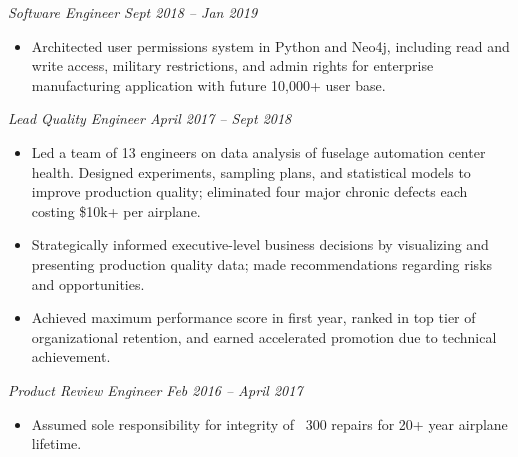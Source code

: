 \documentclass[10pt,letterpaper]{article}
\begin{document}
        \quad \emph{Software Engineer \hfill Sept 2018 – Jan 2019}

            \begin{itemize}[label={--}, leftmargin=.5in, labelindent=16pt, topsep=1pt]
                \setlength\itemsep{-.25em}
            	\item Architected user permissions system in Python and Neo4j, including read and write access, military restrictions, and admin rights for enterprise manufacturing application with future 10,000+ user base.
            \end{itemize}

        \quad \emph{Lead Quality Engineer \hfill April 2017 – Sept 2018}

            \begin{itemize}[label={--}, leftmargin=.5in, labelindent=16pt, topsep=1pt]
                \setlength\itemsep{-.25em}
            	\item Led a team of 13 engineers on data analysis of fuselage automation center health. Designed experiments, sampling plans, and statistical models to improve production quality; eliminated four major chronic defects each costing \$10k+ per airplane.
            	\item Strategically informed executive-level business decisions by visualizing and presenting production quality data; made recommendations regarding risks and opportunities.
            	\item Achieved maximum performance score in first year, ranked in top tier of organizational retention, and earned accelerated promotion due to technical achievement.
            \end{itemize}

        \quad \emph{Product Review Engineer \hfill Feb 2016 – April 2017}

            \begin{itemize}[label={--}, leftmargin=.5in, labelindent=16pt, topsep=1pt]
            \setlength\itemsep{-.25em}
            	\item Assumed sole responsibility for integrity of ~300 repairs for 20+ year airplane lifetime.
            \end{itemize}
\end{document}
